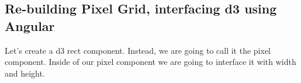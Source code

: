 \subsection{ Re-building Pixel Grid, interfacing d3 using Angular }
Let's create a d3 rect component. Instead, we are going to call it the pixel
component. Inside of our pixel component we are going to interface it with
width and height.
